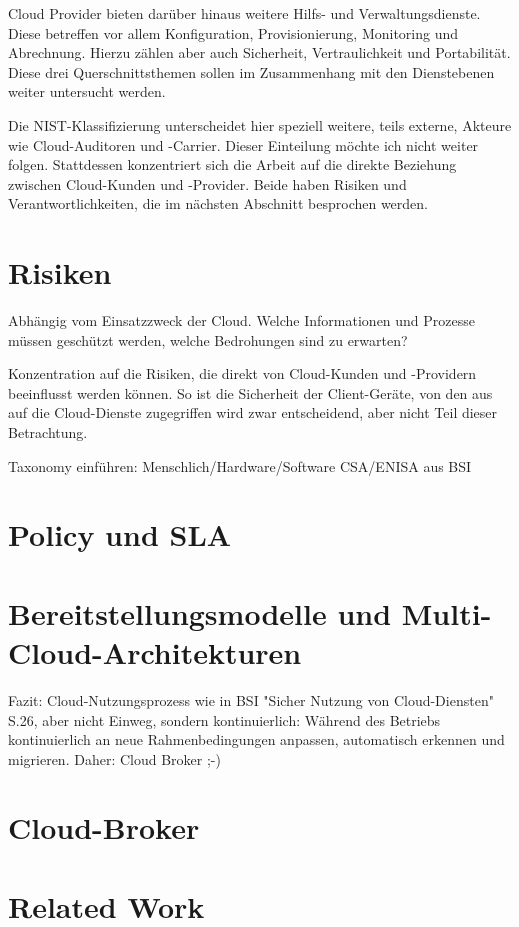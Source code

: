 \noindent
Cloud Provider bieten darüber hinaus weitere Hilfs- und Verwaltungsdienste. Diese betreffen vor allem Konfiguration, Provisionierung, Monitoring und Abrechnung. Hierzu zählen aber auch Sicherheit, Vertraulichkeit und Portabilität. Diese drei Querschnittsthemen sollen im Zusammenhang mit den Dienstebenen weiter untersucht werden.

Die NIST-Klassifizierung unterscheidet hier speziell weitere, teils externe, Akteure wie Cloud-Auditoren und -Carrier. Dieser Einteilung möchte ich nicht weiter folgen. Stattdessen konzentriert sich die Arbeit auf die direkte Beziehung zwischen Cloud-Kunden und -Provider. Beide haben Risiken und Verantwortlichkeiten, die im nächsten Abschnitt besprochen werden.

\section{Risiken}

Abhängig vom Einsatzzweck der Cloud. Welche Informationen und Prozesse müssen geschützt werden, welche Bedrohungen sind zu erwarten?

Konzentration auf die Risiken, die direkt von Cloud-Kunden und -Providern beeinflusst werden können. So ist die Sicherheit der Client-Geräte, von den aus auf die Cloud-Dienste zugegriffen wird zwar entscheidend, aber nicht Teil dieser Betrachtung.

Taxonomy einführen: Menschlich/Hardware/Software
CSA/ENISA aus BSI

\section{Policy und SLA}




\section{Bereitstellungsmodelle und Multi-Cloud-Architekturen}



Fazit: Cloud-Nutzungsprozess wie in BSI "Sicher Nutzung von Cloud-Diensten" S.26, aber nicht Einweg, sondern kontinuierlich: Während des Betriebs kontinuierlich an neue Rahmenbedingungen anpassen, automatisch erkennen und migrieren. Daher: Cloud Broker ;-)
\section{Cloud-Broker}


\section{Related Work}
% 
%
%
%
%
%
%
%
%
%

